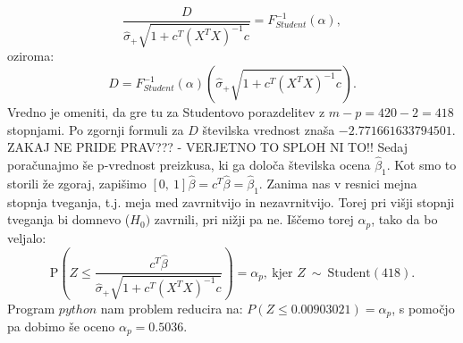 \documentclass{article}
\begin{document}
$$
\frac{D}{\hat{\sigma}_{+}\sqrt{1 + c^T(X^TX)^{-1}c}} = F^{-1}_{Student}(\alpha),
$$
oziroma:
$$
D = F^{-1}_{Student}(\alpha) \left(\hat{\sigma}_{+}\sqrt{1 + c^T(X^TX)^{-1}c}\right).
$$
Vredno je omeniti, da gre tu za Studentovo porazdelitev z $m - p = 420 - 2 = 418$ stopnjami. 
Po zgornji formuli za $D$ številska vrednost znaša $-2.771661633794501$.
\newline
ZAKAJ NE PRIDE PRAV??? - VERJETNO TO SPLOH NI TO!!
\newline
\newline
Sedaj poračunajmo še p-vrednost preizkusa, ki ga določa številska ocena $\hat{\beta}_1$. 
Kot smo to storili že zgoraj, zapišimo $[0,~1]\hat{\beta} = c^T \hat{\beta} = \hat{\beta}_1$.
Zanima nas v resnici mejna stopnja tveganja, t.j. meja med zavrnitvijo in nezavrnitvijo. 
Torej pri višji stopnji tveganja bi domnevo ($H_0)$ zavrnili, pri nižji pa ne. 
Iščemo torej $\alpha_p$, tako da bo veljalo:
$$
\text{P}\left(Z \leq \frac{c^T\hat{\beta}}{\hat{\sigma}_{+}\sqrt{1 + c^T(X^TX)^{-1}c}}\right) = \alpha_p,~\text{kjer }Z~\sim~\text{Student}(418). 
$$
Program $python$ nam problem reducira na: $P(Z \leq 0.00903021) = \alpha_p$, s pomočjo \cite{student} pa dobimo še oceno $\alpha_p = 0.5036$.
\end{document}
